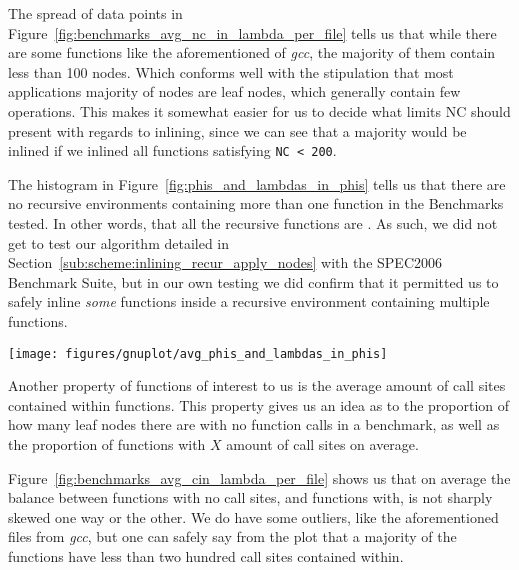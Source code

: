 The spread of data points in
Figure~\ref{fig:benchmarks_avg_nc_in_lambda_per_file} tells us that while there
are some functions like the aforementioned of \textit{gcc}, the majority of them
contain less than 100 nodes. Which conforms well with the stipulation that most
applications majority of nodes are leaf nodes, which generally contain few
operations. This makes it somewhat easier for us to decide what limits NC should
present with regards to inlining, since we can see that a majority would be
inlined if we inlined all functions satisfying \lstinline|NC < 200|.

The histogram in Figure~\ref{fig:phis_and_lambdas_in_phis} tells us that there
are no recursive environments containing more than one function in the
Benchmarks tested. In other words, that all the recursive functions are
. As such, we did not get to test our algorithm
detailed in Section~\ref{sub:scheme:inlining_recur_apply_nodes} with the
SPEC2006 Benchmark Suite, but in our own testing we did confirm that it
permitted us to safely inline \textit{some} functions inside a recursive
environment containing multiple functions.

\begin{centering}
	\noindent\begin{minipage}{\textwidth}
		\captionsetup{type=figure}
		\hspace{-1em}
		\texttt{[image: figures/gnuplot/avg\_phis\_and\_lambdas\_in\_phis]}
	\end{minipage}
	\label{fig:phis_and_lambdas_in_phis}
\end{centering}

Another property of functions of interest to us is the average amount of call
sites contained within functions. This property gives us an idea as to the
proportion of how many leaf nodes there are with no function calls in a
benchmark, as well as the proportion of functions with $X$ amount of call sites
on average.

Figure~\ref{fig:benchmarks_avg_cin_lambda_per_file} shows us that on average the
balance between functions with no call sites, and functions with, is not sharply
skewed one way or the other. We do have some outliers, like the aforementioned
files from \textit{gcc}, but one can safely say from the plot that a majority of
the functions have less than two hundred call sites contained within.

